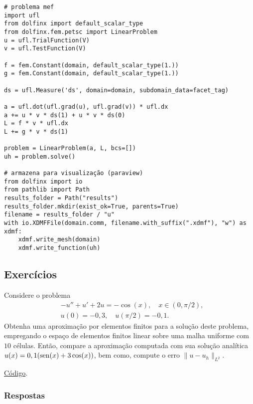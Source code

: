 \begin{ex}
\begin{lstlisting}
# problema mef
import ufl
from dolfinx import default_scalar_type
from dolfinx.fem.petsc import LinearProblem
u = ufl.TrialFunction(V)
v = ufl.TestFunction(V)

f = fem.Constant(domain, default_scalar_type(1.))
g = fem.Constant(domain, default_scalar_type(1.))

ds = ufl.Measure('ds', domain=domain, subdomain_data=facet_tag)

a = ufl.dot(ufl.grad(u), ufl.grad(v)) * ufl.dx
a += u * v * ds(1) + u * v * ds(0)
L = f * v * ufl.dx
L += g * v * ds(1)

problem = LinearProblem(a, L, bcs=[])
uh = problem.solve()

# armazena para visualização (paraview)
from dolfinx import io
from pathlib import Path
results_folder = Path("results")
results_folder.mkdir(exist_ok=True, parents=True)
filename = results_folder / "u"
with io.XDMFFile(domain.comm, filename.with_suffix(".xdmf"), "w") as xdmf:
    xdmf.write_mesh(domain)
    xdmf.write_function(uh)  
\end{lstlisting}

\end{ex}

\subsection{Exercícios}
\badgeRevisar

\begin{exer}\label{exer:dcr}
  Considere o problema
  \begin{align}
    &-u'' + u' + 2u = -\cos(x),\quad x\in (0, \pi/2),\\
    &u(0)=-0,3,\quad u(\pi/2)=-0,1.
  \end{align}
  Obtenha uma aproximação por elementos finitos para a solução deste problema, empregando o espaço de elementos finitos linear sobre uma malha uniforme com $10$ células. Então, compare a aproximação computada com sua solução analítica $u(x) = 0,1(\operatorname{sen}(x)+3\cos(x))$, bem como, compute o erro $\|u-u_h\|_{L^2}$.
\end{exer}
\begin{resp}
  \ifispython
  \href{https://github.com/phkonzen/notas/blob/master/src/MetodoElementosFinitos/cap_mef1d/dados/exer_dcr/exer_dcr.py}{Código}.
  \fi
\end{resp}

\ifisbook
\subsubsection{Respostas}
\shipoutAnswer
\fi


